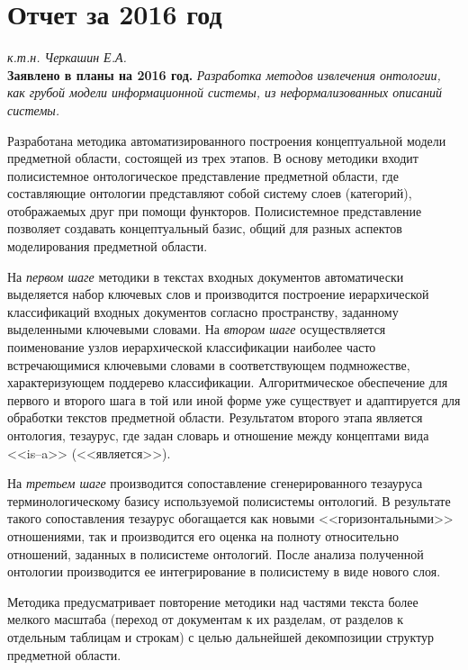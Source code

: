 \documentclass[12pt,a4paper]{extarticle}
\begin{document}
\section{Отчет за 2016 год}
\label{sec:report2016}

\begin{raggedleft}
{}\hfill  {\itshape к.т.н. Черкашин Е.А.}\\
{\bfseries Заявлено в планы на 2016 год.} {\itshape Разработка методов извлечения
онтологии, как грубой модели информационной системы, из неформализованных описаний системы.}
\end{raggedleft}

Разработана методика автоматизированного построения концептуальной модели
предметной области, состоящей из трех этапов.  В основу методики входит полисистемное онтологическое представление предметной
области, где составляющие онтологии представляют собой систему слоев
(категорий), отображаемых друг при помощи функторов.  Полисистемное представление позволяет создавать концептуальный базис,
общий для разных аспектов моделирования предметной области.

На \emph{первом шаге} методики в текстах входных документов автоматически выделяется
набор ключевых слов и производится построение иерархической классификаций
входных документов согласно пространству, заданному выделенными ключевыми
словами.  На \emph{втором шаге} осуществляется поименование узлов иерархической
классификации наиболее часто встречающимися ключевыми словами в соответствующем
подмножестве, характеризующем поддерево классификации.  Алгоритмическое
обеспечение для первого и второго шага в той или иной форме уже существует и
адаптируется для обработки текстов предметной области.  Результатом второго
этапа является онтология, тезаурус, где задан словарь и отношение между
концептами вида <<is--a>> (<<является>>).

На \emph{третьем шаге} производится сопоставление сгенерированного тезауруса
терминологическому базису используемой полисистемы онтологий.  В результате
такого сопоставления тезаурус обогащается как новыми <<горизонтальными>>
отношениями, так и производится его оценка на полноту относительно отношений,
заданных в полисистеме онтологий.  После анализа полученной онтологии
производится ее интегрирование в полисистему в виде нового слоя.

Методика предусматривает повторение методики над частями текста более мелкого
масштаба (переход от документам к их разделам, от разделов к отдельным таблицам
и строкам) с целью дальнейшей декомпозиции структур предметной области.
\end{document}
